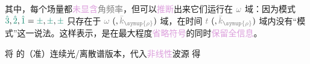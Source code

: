 其中，每个场量都\textcolor{Plum}{未显含}\textcolor{gray}{角频率}，但可以\textcolor{Plum}{推断}出来它们运行在 $\mathcolor{gray}{\omega}$ 域：因为\textcolor{PineGreen}{模式} $\textcolor{PineGreen}{\hat{3}},\textcolor{PineGreen}{\hat{2}},\textcolor{PineGreen}{\hat{1}} = \textcolor{PineGreen}{\pm},\textcolor{PineGreen}{\pm},\textcolor{PineGreen}{\pm}$ 只存在于 $\mathcolor{gray}{\omega}~ (, \mathcolor{gray}{\bar{k}_{\symup{\rho}}})$ 域，在时间 $\mathcolor{gray}{t}~ (, \mathcolor{gray}{\bar{k}_{\symup{\rho}}})$ 域内没有“\textcolor{PineGreen}{模式}”这一说法。这样表示，是在最大程度\textcolor{Plum}{省略符号}的同时\textcolor{Plum}{保留全信息}。

将  的\textcolor{NavyBlue}{（准）连续光}/\textcolor{NavyBlue}{离散谱}版本，代入\textcolor{Plum}{非线性}\textcolor{NavyBlue}{波源}  得
